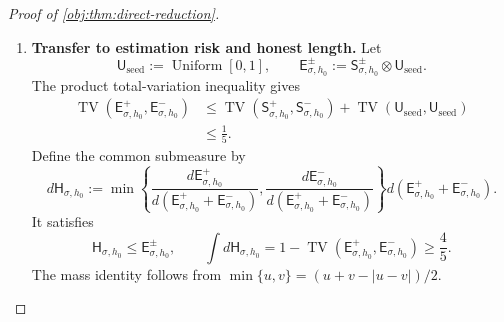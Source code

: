 \documentclass[11pt]{article}
\begin{document}
\begin{proof}[Proof of \cref{obj:thm:direct-reduction}]
\begin{enumerate}
For a sample
\[
\mathbf s=((x_i,d_i,y_i))_{i=1}^n
\in(\mathbb R\times\{0,1\}^2)^n,
\]
define the common Gaussian observation kernel by
\[
\mathsf K_{\sigma,n}(\mathbf s,\mathsf F)
:=
\Pr\!\left\{
((x_i+\sigma\varepsilon_i,d_i,y_i))_{i=1}^n
\in\mathsf F
\right\},
\qquad
(\varepsilon_i)_{i=1}^n\sim N(0,1)^{\otimes n}.
\]
The Gaussian variables in this definition are independent of the input sample. Gaussian error independence under the direct laws implies
\[
\mathsf S_{\sigma,h_0}^{\pm}
=\mathsf K_{\sigma,n}\mathsf S_{0,h_0}^{\pm}.
\]
For every measurable output event \(\mathsf F\), the function
\(\mathsf K_{\sigma,n}(\cdot,\mathsf F)\) takes values in \([0,1]\). The layer-cake formula therefore bounds the difference of its integrals by
\[
\begin{aligned}
&\left|
\int\mathsf K_{\sigma,n}(\mathbf s,\mathsf F)
\,d\mathsf S_{0,h_0}^+(\mathbf s)
-
\int\mathsf K_{\sigma,n}(\mathbf s,\mathsf F)
\,d\mathsf S_{0,h_0}^-(\mathbf s)
\right|\\
&\qquad\le
\int_0^1
\left|
\mathsf S_{0,h_0}^+
\{\mathsf K_{\sigma,n}(\cdot,\mathsf F)>t\}
-
\mathsf S_{0,h_0}^-
\{\mathsf K_{\sigma,n}(\cdot,\mathsf F)>t\}
\right|\,dt\\
&\qquad\le
\operatorname{TV}(\mathsf S_{0,h_0}^+,\mathsf S_{0,h_0}^-).
\end{aligned}
\]
Taking the supremum over output events proves
\[
\operatorname{TV}(\mathsf S_{\sigma,h_0}^+,\mathsf S_{\sigma,h_0}^-)
\le
\operatorname{TV}(\mathsf S_{0,h_0}^+,\mathsf S_{0,h_0}^-)
\le\frac15.
\]
The construction and this inequality also apply at \(\sigma=0\).

\item \textbf{Transfer to estimation risk and honest length.}
Let
\[
\mathsf U_{\mathrm{seed}}:=\operatorname{Uniform}[0,1],
\qquad
\mathsf E_{\sigma,h_0}^{\pm}
:=\mathsf S_{\sigma,h_0}^{\pm}\otimes\mathsf U_{\mathrm{seed}}.
\]
The product total-variation inequality gives
\[
\begin{aligned}
\operatorname{TV}(\mathsf E_{\sigma,h_0}^+,\mathsf E_{\sigma,h_0}^-)
&\le
\operatorname{TV}(\mathsf S_{\sigma,h_0}^+,\mathsf S_{\sigma,h_0}^-)
+\operatorname{TV}(\mathsf U_{\mathrm{seed}},\mathsf U_{\mathrm{seed}})\\
&\le\frac15.
\end{aligned}
\]
Define the common submeasure by
\[
d\mathsf H_{\sigma,h_0}
:=
\min\!\left\{
\frac{d\mathsf E_{\sigma,h_0}^+}
{d(\mathsf E_{\sigma,h_0}^++\mathsf E_{\sigma,h_0}^-)},
\frac{d\mathsf E_{\sigma,h_0}^-}
{d(\mathsf E_{\sigma,h_0}^++\mathsf E_{\sigma,h_0}^-)}
\right\}
d(\mathsf E_{\sigma,h_0}^++\mathsf E_{\sigma,h_0}^-).
\]
It satisfies
\[
\mathsf H_{\sigma,h_0}\le\mathsf E_{\sigma,h_0}^{\pm},
\qquad
\int d\mathsf H_{\sigma,h_0}
=
1-\operatorname{TV}(\mathsf E_{\sigma,h_0}^+,\mathsf E_{\sigma,h_0}^-)
\ge\frac45.
\]
The mass identity follows from
\(\min\{u,v\}=(u+v-|u-v|)/2\).


\end{enumerate}
\end{proof}
\end{document}

